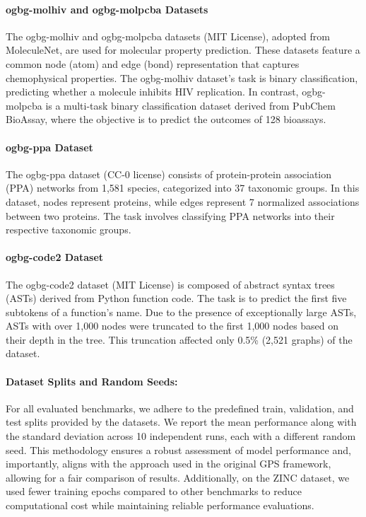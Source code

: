 \documentclass{acmart}
\begin{document}
\paragraph{ogbg-molhiv and ogbg-molpcba Datasets \cite{hu2021opengraphbenchmarkdatasets}}
The ogbg-molhiv and ogbg-molpcba datasets (MIT License), adopted from MoleculeNet, are used for molecular property prediction. These datasets feature a common node (atom) and edge (bond) representation that captures chemophysical properties. The ogbg-molhiv dataset's task is binary classification, predicting whether a molecule inhibits HIV replication. In contrast, ogbg-molpcba is a multi-task binary classification dataset derived from PubChem BioAssay, where the objective is to predict the outcomes of 128 bioassays.

\paragraph{ogbg-ppa Dataset \cite{hu2021opengraphbenchmarkdatasets}}
The ogbg-ppa dataset (CC-0 license) consists of protein-protein association (PPA) networks from 1,581 species, categorized into 37 taxonomic groups. In this dataset, nodes represent proteins, while edges represent 7 normalized associations between two proteins. The task involves classifying PPA networks into their respective taxonomic groups.

\paragraph{ogbg-code2 Dataset \cite{hu2021opengraphbenchmarkdatasets}}
The ogbg-code2 dataset (MIT License) is composed of abstract syntax trees (ASTs) derived from Python function code. The task is to predict the first five subtokens of a function’s name. Due to the presence of exceptionally large ASTs, ASTs with over 1,000 nodes were truncated to the first 1,000 nodes based on their depth in the tree. This truncation affected only 0.5\% (2,521 graphs) of the dataset.

\paragraph{Dataset Splits and Random Seeds:}
For all evaluated benchmarks, we adhere to the predefined train, validation, and test splits provided by the datasets. We report the mean performance along with the standard deviation across 10 independent runs, each with a different random seed. This methodology ensures a robust assessment of model performance and, importantly, aligns with the approach used in the original GPS framework, allowing for a fair comparison of results. Additionally, on the ZINC dataset, we used fewer training epochs compared to other benchmarks to reduce computational cost while maintaining reliable performance evaluations.
\end{document}
